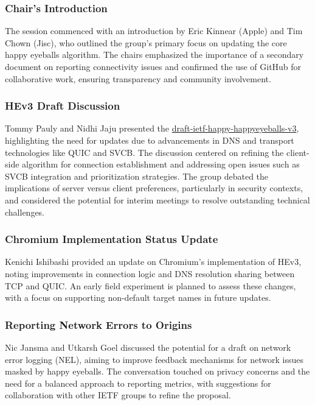 \documentclass{article}
\begin{document}
\subsubsection{Chair's Introduction}
The session commenced with an introduction by Eric Kinnear (Apple) and Tim Chown (Jisc), who outlined the group's primary focus on updating the core happy eyeballs algorithm. The chairs emphasized the importance of a secondary document on reporting connectivity issues and confirmed the use of GitHub for collaborative work, ensuring transparency and community involvement.

\subsubsection{HEv3 Draft Discussion}
Tommy Pauly and Nidhi Jaju presented the \href{https://datatracker.ietf.org/doc/html/draft-ietf-happy-happyeyeballs-v3}{draft-ietf-happy-happyeyeballs-v3}, highlighting the need for updates due to advancements in DNS and transport technologies like QUIC and SVCB. The discussion centered on refining the client-side algorithm for connection establishment and addressing open issues such as SVCB integration and prioritization strategies. The group debated the implications of server versus client preferences, particularly in security contexts, and considered the potential for interim meetings to resolve outstanding technical challenges.

\subsubsection{Chromium Implementation Status Update}
Kenichi Ishibashi provided an update on Chromium's implementation of HEv3, noting improvements in connection logic and DNS resolution sharing between TCP and QUIC. An early field experiment is planned to assess these changes, with a focus on supporting non-default target names in future updates.

\subsubsection{Reporting Network Errors to Origins}
Nic Jansma and Utkarsh Goel discussed the potential for a draft on network error logging (NEL), aiming to improve feedback mechanisms for network issues masked by happy eyeballs. The conversation touched on privacy concerns and the need for a balanced approach to reporting metrics, with suggestions for collaboration with other IETF groups to refine the proposal.
\end{document}
